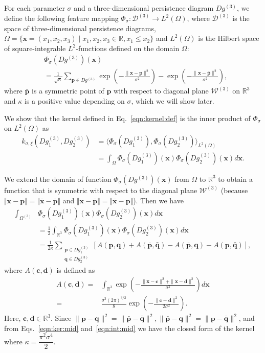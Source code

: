 \documentclass[twocolumn,pre,amsmath,amssymb]{revtex4-1}
\newcommand{\bx}{\ensuremath{\boldsymbol{x}}}
\newcommand{\bp}{\ensuremath{\boldsymbol{p}}}
\newcommand{\bq}{\ensuremath{\boldsymbol{q}}}
\newcommand{\bbp}{\ensuremath{\boldsymbol{\bar{p}}}}
\newcommand{\bbq}{\ensuremath{\boldsymbol{\bar{q}}}}
\newcommand{\bbx}{\ensuremath{\boldsymbol{\bar{x}}}}
\newcommand{\bc}{\ensuremath{\boldsymbol{c}}}
\newcommand{\bd}{\ensuremath{\boldsymbol{d}}}
\begin{document}
	For each parameter $\sigma$ and a three-dimensional persistence diagram $Dg^{(3)}$, we define the following feature mapping $\Phi_{\sigma}: \mathcal{D}^{(3)}\rightarrow L^2(\Omega)$, where $\mathcal{D}^{(3)}$ is the space of three-dimensional persistence diagrams, $\Omega=\{\bx=(x_1, x_2, x_3) \mid x_1, x_2, x_3 \in \mathbb{R}, x_1 \leq x_2\}$ and $L^2(\Omega)$ is the Hilbert space of square-integrable $L^2$-functions defined on the domain $\Omega$: 
	\begin{align}
	 &\Phi_{\sigma}(Dg^{(3)})(\bx) \nonumber\\
	 &= \frac{1}{\sqrt{\kappa}}\sum_{\bp \in Dg^{(3)}}\exp\left(-\frac{\|\bx-\bp\|^2}{\sigma^2}\right) - \exp\left(-\frac{\|\bx-\bbp\|^2}{\sigma^2}\right),
	\end{align}
	where $\bbp$ is a symmetric point of $\bp$ with respect to diagonal plane $\mathcal{W}^{(3)}$ on $\mathbb{R}^3$ and $\kappa$ is a positive value depending on $\sigma$, which we will show later.
	
	We show that the kernel defined in Eq.~\eqref{eqn:kernel:def} is the inner product of $\Phi_{\sigma}$ on $L^2(\Omega)$ as
	\begin{align}
	k_{\sigma,\xi}(Dg^{(3)}_1, Dg^{(3)}_2) &= \langle \Phi_{\sigma}(Dg^{(3)}_1), \Phi_{\sigma}(Dg^{(3)}_2) \rangle_{L^2(\Omega)} \label{eqn:in:1} \\
	&= \int_{\Omega}\Phi_{\sigma}(Dg^{(3)}_1)(\bx)\Phi_{\sigma}(Dg^{(3)}_2)(\bx)d\bx \label{eqn:in:2}.
	\end{align}
	
	We extend the domain of function  $\Phi_{\sigma}(Dg^{(3)})(\bx)$ from $\Omega$ to $\mathbb{R}^3$ to obtain a function that is symmetric with respect to the diagonal plane $\mathcal{W}^{(3)}$ (because $\Vert\bx - \bp \Vert = \Vert \bbx - \bbp \Vert$ and $\Vert \bx - \bbp \Vert = \Vert \bbx - \bp \Vert$).
	Then we have
	\begin{align}
	\int_{\Omega^{(3)}}&\Phi_{\sigma}(Dg^{(3)}_1)(\bx)\Phi_{\sigma}(Dg^{(3)}_2)(\bx)d\bx \nonumber\\
	&=\frac{1}{2}\int_{\mathbb{R}^3}\Phi_{\sigma}(Dg^{(3)}_1)(\bx)\Phi_{\sigma}(Dg^{(3)}_2)(\bx)d\bx\nonumber\\
	&= \frac{1}{2\kappa}\sum_{\substack{\bp\in Dg^{(3)}_1\\ \bq \in Dg^{(3)}_2}}\left[A(\bp, \bq) + A(\bbp, \bbq) - A(\bbp, \bq) - A(\bp, \bbq)\right], \label{eqn:ker:mid}
	\end{align}
	where $A(\bc, \bd)$ is defined as
	\begin{align}
	A(\bc, \bd)=&\int_{\mathbb{R}^3}\exp\left(-\frac{\|\bx-\bc\|^2+\|\bx-\bd\|^2}{\sigma^2}\right)d\bx\nonumber\\
	=&\frac{\sigma^3(2\pi)^{3/2}}{8}\exp\left(-\frac{\|\bc-\bd\|^2}{2\sigma^2}\right).\label{eqn:int:mid}
	\end{align}
	Here, $\bc, \bd \in \mathbb{R}^3$. Since $\|\bp-\bq\|^2=\|\bbp-\bbq\|^2, \|\bbp-\bq\|^2=\|\bp-\bbq\|^2$, and from Eqs.~\eqref{eqn:ker:mid} and~\eqref{eqn:int:mid}
	we have the closed form of the kernel where $\kappa=\dfrac{\pi^2\sigma^4}{2}$.
	
\end{document}
